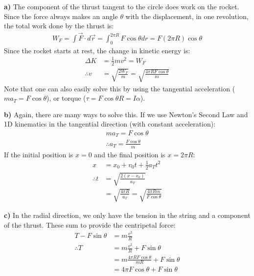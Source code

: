 \begin{solution}
\textbf{a)} The component of the thrust tangent to the circle does work on the rocket. Since the force always makes an angle $\theta$ with the displacement, in one revolution, the total work done by the thrust is:
\begin{align*}
W_F=\int \vec F\cdot d\vec r=\int_0^{2\pi R} F\cos\theta dr=F(2\pi R)\cos\theta
\end{align*}
Since the rocket starts at rest, the change in kinetic energy is:
\begin{align*}
\Delta K &= \frac{1}{2}mv^2=W_F\\
\therefore v &= \sqrt{\frac{2W_F}{m}} = \sqrt{\frac{4\pi R F\cos\theta}{m}}
\end{align*}
Note that one can also easily solve this by using the tangential acceleration ($ma_T=F\cos\theta$), or torque ($\tau=F\cos\theta R=I\alpha$).

\textbf{b)} Again, there are many ways to solve this. If we use Newton's Second Law and 1D kinematics in the tangential direction (with constant acceleration):
\begin{align*}
ma_T=F\cos\theta\\
\therefore a_T=\frac{F\cos\theta}{m}
\end{align*}
If the initial position is $x=0$ and the final position is $x=2\pi R$:
\begin{align*}
x &= x_0 + v_0t+\frac{1}{2}a_Tt^2\\
\therefore t&=\sqrt{\frac{2(x-x_0)}{a_T}}\\
&= \sqrt{\frac{4\pi R}{a_T}}=\sqrt{\frac{4\pi Rm}{F\cos\theta}}
\end{align*}

\textbf{c)} In the radial direction, we only have the tension in the string and a component of the thrust. These sum to provide the centripetal force:
\begin{align*}
T-F\sin\theta&=m\frac{v^2}{R}\\
\therefore T&=m\frac{v^2}{R}+F\sin\theta\\
&=m\frac{4\pi R F\cos\theta}{mR}+F\sin\theta\\
&=4\pi F\cos\theta+F\sin\theta\\
\end{align*}
\end{solution}


